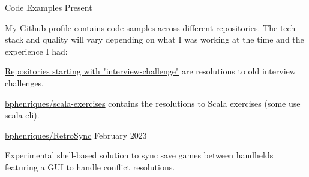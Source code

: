 \begin{cventries}
  \vspace{2mm}

    
\openSourceEntry
    {Code Examples}
    {Present}
    {   
    \begin{openSourceDescription}
    My Github profile contains code samples across different repositories. The tech stack and quality will vary depending on what I was working at the time and the experience I had:
    \end{openSourceDescription}
    \vspace{8mm}
    \begin{openSourceItems}
        \item \href{https://github.com/bphenriques?tab=repositories&q=interview-challenge&type=&language=&sort=}{Repositories starting with "interview-challenge"} are resolutions to old interview challenges.
        \item \href{https://github.com/bphenriques/scala-exercises}{bphenriques/scala-exercises} contains the resolutions to Scala exercises (some use \href{https://scala-cli.virtuslab.org/}{scala-cli}).
    \end{openSourceItems}
    \vspace{4mm}
    }

  \vspace{2mm}

\openSourceEntry
    {\href{https://github.com/bphenriques/knowledge-base}{bphenriques/RetroSync}}
    {February 2023}
    {   
    \begin{openSourceDescription}
    Experimental shell-based solution to sync save games between handhelds featuring a GUI to handle conflict resolutions.
    \end{openSourceDescription}
    \vspace{4mm}
    }
    
\end{cventries}
